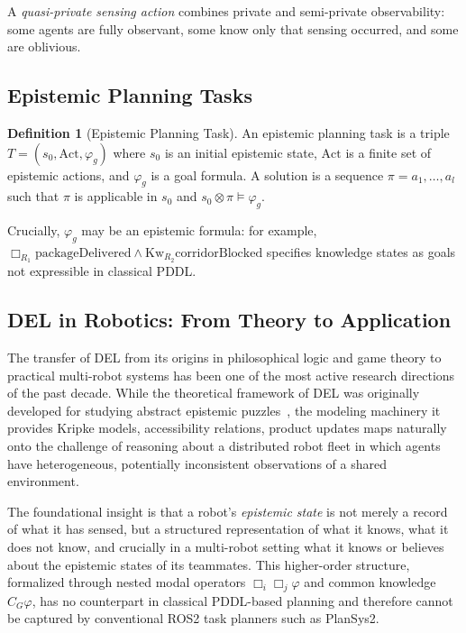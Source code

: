 \documentclass[12pt,a4paper]{article}
\theoremstyle{definition}
\newtheorem{definition}{Definition}[section]
\theoremstyle{plain}
\begin{document}
A \textit{quasi-private sensing action} combines private and semi-private observability: some
agents are fully observant, some know only that sensing occurred, and some are oblivious.

\subsection{Epistemic Planning Tasks}

\begin{definition}[Epistemic Planning Task]
An epistemic planning task is a triple $T = (s_0, \mathrm{Act}, \varphi_g)$ where $s_0$ is an
initial epistemic state, $\mathrm{Act}$ is a finite set of epistemic actions, and $\varphi_g$ is
a goal formula. A solution is a sequence $\pi = a_1, \ldots, a_l$ such that $\pi$ is applicable
in $s_0$ and $s_0 \otimes \pi \models \varphi_g$.
\end{definition}

Crucially, $\varphi_g$ may be an epistemic formula: for example,
$\Box_{R_1}\mathrm{packageDelivered} \wedge \mathrm{Kw}_{R_2}\mathrm{corridorBlocked}$
specifies knowledge states as goals not expressible in classical PDDL.

\subsection{DEL in Robotics: From Theory to Application}
\label{subsec:del_robotics}

The transfer of DEL from its origins in philosophical logic and game theory to practical
multi-robot systems has been one of the most active research directions of the past
decade. While the theoretical framework of DEL was originally developed for studying
abstract epistemic puzzles~\cite{baltag1998logic, vanditmarsch2007}, the modeling
machinery it provides Kripke models, accessibility relations, product updates maps
naturally onto the challenge of reasoning about a distributed robot fleet in which
agents have heterogeneous, potentially inconsistent observations of a shared environment.

The foundational insight is that a robot's \textit{epistemic state} is not merely a
record of what it has sensed, but a structured representation of what it knows, what
it does not know, and crucially in a multi-robot setting what it knows or believes
about the epistemic states of its teammates. This higher-order structure, formalized
through nested modal operators $\Box_i \Box_j \varphi$ and common knowledge $C_G \varphi$,
has no counterpart in classical PDDL-based planning and therefore cannot be captured by
conventional ROS2 task planners such as PlanSys2.
\end{document}
